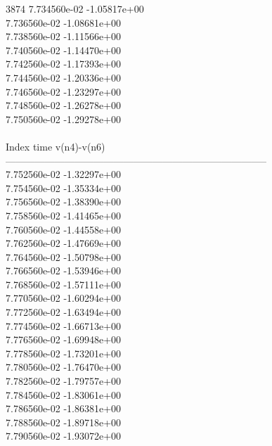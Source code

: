 3874	7.734560e-02	-1.05817e+00	\\ 	7.736560e-02	-1.08681e+00	\\ 	7.738560e-02	-1.11566e+00	\\ 	7.740560e-02	-1.14470e+00	\\ 	7.742560e-02	-1.17393e+00	\\ 	7.744560e-02	-1.20336e+00	\\ 	7.746560e-02	-1.23297e+00	\\ 	7.748560e-02	-1.26278e+00	\\ 	7.750560e-02	-1.29278e+00	\\ \hline
\\ \hline
Index   time            v(n4)-v(n6)     \\ \hline
--------------------------------------------------------------------------------\\ 	7.752560e-02	-1.32297e+00	\\ 	7.754560e-02	-1.35334e+00	\\ 	7.756560e-02	-1.38390e+00	\\ 	7.758560e-02	-1.41465e+00	\\ 	7.760560e-02	-1.44558e+00	\\ 	7.762560e-02	-1.47669e+00	\\ 	7.764560e-02	-1.50798e+00	\\ 	7.766560e-02	-1.53946e+00	\\ 	7.768560e-02	-1.57111e+00	\\ 	7.770560e-02	-1.60294e+00	\\ 	7.772560e-02	-1.63494e+00	\\ 	7.774560e-02	-1.66713e+00	\\ 	7.776560e-02	-1.69948e+00	\\ 	7.778560e-02	-1.73201e+00	\\ 	7.780560e-02	-1.76470e+00	\\ 	7.782560e-02	-1.79757e+00	\\ 	7.784560e-02	-1.83061e+00	\\ 	7.786560e-02	-1.86381e+00	\\ 	7.788560e-02	-1.89718e+00	\\ 	7.790560e-02	-1.93072e+00	\\ \hline
